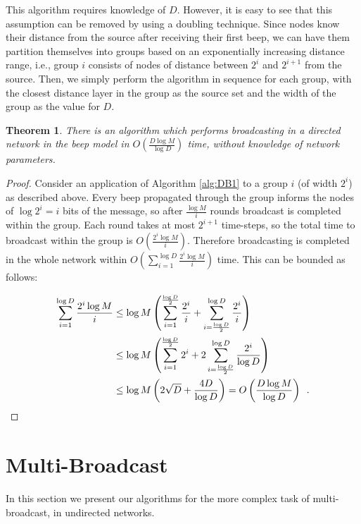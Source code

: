 \documentclass{article}
\newtheorem{theorem}{Theorem}
\begin{document}
This algorithm requires knowledge of $D$. However, it is easy to see that this assumption can be removed by using a doubling technique. Since nodes know their distance from the source after receiving their first beep, we can have them partition themselves into groups based on an exponentially increasing distance range, i.e., group $i$ consists of nodes of distance between $2^i$ and $2^{i+1}$ from the source. Then, we simply perform the algorithm in sequence for each group, with the closest distance layer in the group as the source set and the width of the group as the value for $D$. 

\begin{theorem}
	There is an algorithm which performs broadcasting in a directed network in the beep model in $O(\frac{D\log M}{\log D})$ time, without knowledge of network parameters.
\end{theorem}

\begin{proof}
	Consider an application of Algorithm \ref{alg:DB1} to a group $i$ (of width $2^i$) as described above. Every beep propagated through the group informs the nodes of $\log 2^i = i$ bits of the message, so after $\frac {\log M}{i}$ rounds broadcast is completed within the group. Each round takes at most $2^{i+1}$ time-steps, so the total time to broadcast within the group is $O(\frac{2^i \log M}{i})$. Therefore broadcasting is completed in the whole network within $O\left(\sum\limits_{i=1}^{\log D} \frac{2^i \log M}{i}\right)$ time. This can be bounded as follows:
	
	\begin{align*}
	\sum_{i=1}^{\log D} \frac{2^i \log M}{i}
	&\le
	\log M \left(\sum_{i=1}^{\frac{\log D}{2}} \frac{2^i}{i} +
	\sum_{i=\frac{\log D}{2}}^{\log D} \frac{2^i}{i}\right)
	\\
	&\le
	\log M \left(\sum_{i=1}^{\frac{\log D}{2}} 2^i +
	2\sum_{i=\frac{\log D}{2}}^{\log D} \frac{2^i}{\log D}\right)
	\\
	&\le
	\log M \left(2\sqrt D + \frac{4D}{\log D}\right)
	=
	O\left(\frac{D\log M}{\log D}\right)
	\enspace.
	\qedhere
	\end{align*}
\end{proof}

\section{Multi-Broadcast}
In this section we present our algorithms for the more complex task of multi-broadcast, in undirected networks.
\end{document}
